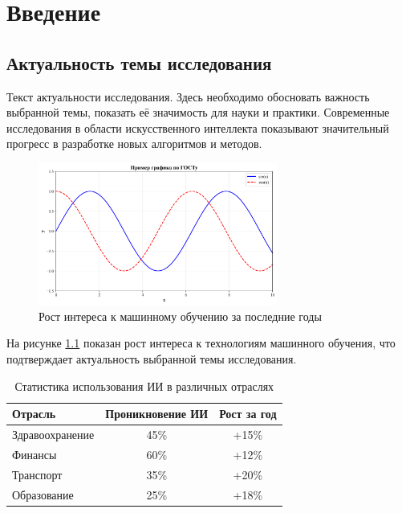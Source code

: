 \chapter{Введение}

\section{Актуальность темы исследования}

Текст актуальности исследования. Здесь необходимо обосновать важность выбранной темы, показать её значимость для науки и практики. Современные исследования в области искусственного интеллекта \cite{ai_survey} показывают значительный прогресс в разработке новых алгоритмов и методов.

\begin{figure}[H]
\centering
\includegraphics[width=0.7\textwidth]{images/example_plot.png}
\caption{Рост интереса к машинному обучению за последние годы}
\label{fig:ml_growth}
\end{figure}

На рисунке \ref{fig:ml_growth} показан рост интереса к технологиям машинного обучения, что подтверждает актуальность выбранной темы исследования.

\begin{table}[H]
\centering
\caption{Статистика использования ИИ в различных отраслях}
\label{tab:ai_usage_stats}
\begin{tabular}{|l|c|c|}
\hline
\textbf{Отрасль} & \textbf{Проникновение ИИ} & \textbf{Рост за год} \\
\hline
Здравоохранение & 45\% & +15\% \\
Финансы & 60\% & +12\% \\
Транспорт & 35\% & +20\% \\
Образование & 25\% & +18\% \\
\hline
\end{tabular}
\end{table}

